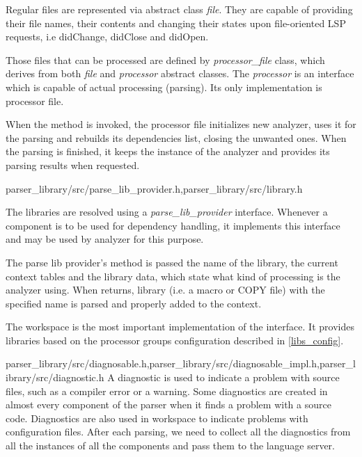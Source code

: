 Regular files are represented via abstract class \emph{file}. They are capable of providing their file names, their contents and changing their states upon file-oriented LSP requests, i.e didChange, didClose and didOpen.

Those files that can be processed are defined by \emph{processor\_file} class, which derives from both \emph{file} and \emph{processor} abstract classes. The \emph{processor} is an interface which is capable of actual processing (parsing). Its only implementation is processor file.

When the  method is invoked, the processor file initializes new analyzer, uses it for the parsing and rebuilds its dependencies list, closing the unwanted ones. When the parsing is finished, it keeps the instance of the analyzer and provides its parsing results when requested.


{parser\_library/src/parse\_lib\_provider.h,parser\_library/src/library.h}

The libraries are resolved using a \emph{parse\_lib\_provider} interface. Whenever a component is to be used for dependency handling, it implements this interface and may be used by analyzer for this purpose.

The parse lib provider's  method is passed the name of the library, the current context tables and the library data, which state what kind of processing is the analyzer using. When  returns, library (i.e. a macro or COPY file) with the specified name is parsed and properly added to the context.

The workspace is the most important implementation of the  interface. It provides libraries based on the processor groups configuration described in \cref{libs_config}.

{parser\_library/src/diagnosable.h,parser\_library/src/diagnosable\_impl.h,parser\_library/src/diagnostic.h}
A diagnostic is used to indicate a problem with source files, such as a compiler error or a warning. Some diagnostics are created in almost every component of the parser when it finds a problem with a source code. Diagnostics are also used in workspace to indicate problems with configuration files. After each parsing, we need to collect all the diagnostics from all the instances of all the components and pass them to the language server.

